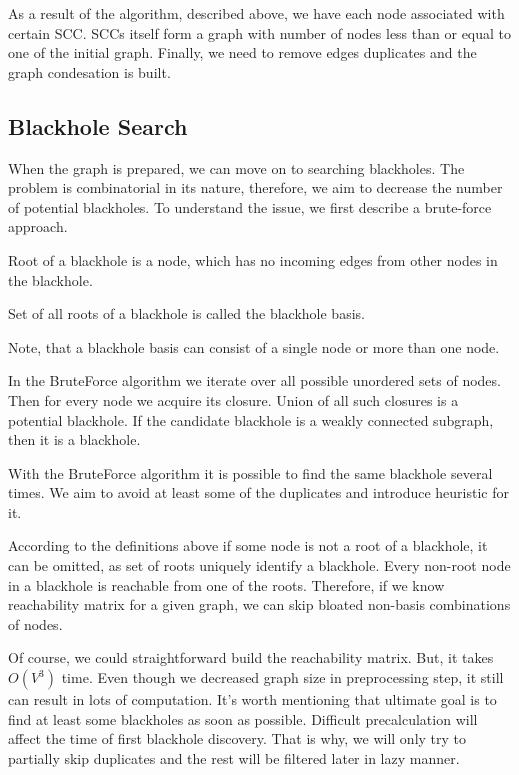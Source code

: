 \documentclass{svproc}
\begin{document}
As a result of the algorithm, described above, we have each node associated with certain SCC.
SCCs itself form a graph with number of nodes less than or equal to one of the initial graph.
Finally, we need to remove edges duplicates and the graph condesation is built.

%

%
\subsection{Blackhole Search}
When the graph is prepared, we can move on to searching blackholes. The problem is combinatorial in its nature, therefore, we aim to
decrease the number of potential blackholes.
To understand the issue, we first describe a brute-force approach. 

\begin{definition}
Root of a blackhole is a node, which has no incoming edges from other nodes in the blackhole.
\end{definition}

\begin{definition}
Set of all roots of a blackhole is called the blackhole basis.
\end{definition}

Note, that a blackhole basis can consist of a single node or more than one node. 

In the BruteForce algorithm we iterate over all possible unordered sets of nodes. 
Then for every node we acquire its closure. Union of all such closures is a potential blackhole.
If the candidate blackhole is a weakly connected subgraph, then it is a blackhole.

With the BruteForce algorithm it is possible to find the same blackhole several times.
We aim to avoid at least some of the duplicates and introduce heuristic for it.

According to the definitions above if some node is not a root of a blackhole, it can be omitted, as set of roots uniquely identify a blackhole.
Every non-root node in a blackhole is reachable from one of the roots. Therefore, if we know reachability matrix for a given graph, we can skip bloated non-basis combinations of nodes.

Of course, we could straightforward build the reachability matrix. But, it takes $O(V^3)$ time. Even though we decreased graph size
in preprocessing step, it still can result in lots of computation. It's worth mentioning that ultimate goal is to find at least some blackholes as soon as possible. 
Difficult precalculation will affect the time of first blackhole discovery. That is why, we will only try to partially skip duplicates and the rest will
be filtered later in lazy manner.
\end{document}
